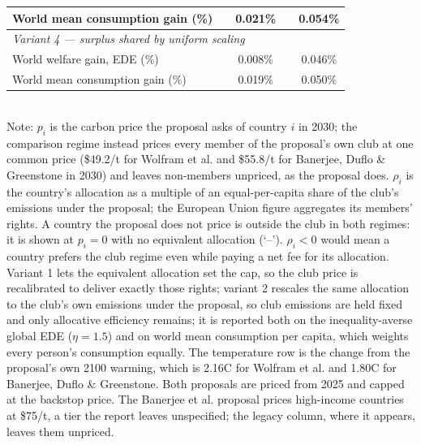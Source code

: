 \begin{table}[htbp]
\begin{tabular}{lcccc}
  \quad World mean consumption gain (\%) &  & 0.021\% &  & 0.054\% \\
  \midrule
  \multicolumn{5}{l}{\textit{Variant 4 --- surplus shared by uniform scaling}} \\
  \quad World welfare gain, EDE (\%) &  & 0.008\% &  & 0.046\% \\
  \quad World mean consumption gain (\%) &  & 0.019\% &  & 0.050\% \\
  \bottomrule
\end{tabular}
\label{tab:equiv_rights_A}
\\[4pt]
{\footnotesize Note: $p_i$ is the carbon price the proposal asks of country $i$ in 2030; the comparison regime instead prices every member of the proposal's own club at one common price (\$49.2/t for Wolfram et al. and \$55.8/t for Banerjee, Duflo \& Greenstone in 2030) and leaves non-members unpriced, as the proposal does. $\rho_i$ is the country's allocation as a multiple of an equal-per-capita share of the club's emissions under the proposal; the European Union figure aggregates its members' rights. A country the proposal does not price is outside the club in both regimes: it is shown at $p_i=0$ with no equivalent allocation (`--'). $\rho_i < 0$ would mean a country prefers the club regime even while paying a net fee for its allocation. Variant 1 lets the equivalent allocation set the cap, so the club price is recalibrated to deliver exactly those rights; variant 2 rescales the same allocation to the club's own emissions under the proposal, so club emissions are held fixed and only allocative efficiency remains; it is reported both on the inequality-averse global EDE ($\eta=1.5$) and on world mean consumption per capita, which weights every person's consumption equally. The temperature row is the change from the proposal's own 2100 warming, which is 2.16\textdegree{}C for Wolfram et al. and 1.80\textdegree{}C for Banerjee, Duflo \& Greenstone. Both proposals are priced from 2025 and capped at the backstop price. The Banerjee et al. proposal prices high-income countries at \$75/t, a tier the report leaves unspecified; the legacy column, where it appears, leaves them unpriced.}
\end{table}
